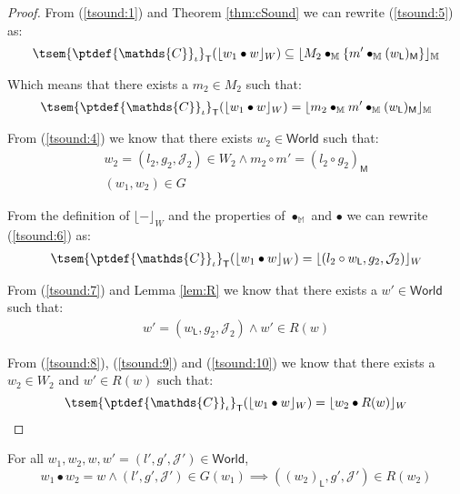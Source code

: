 {\begin{proof}
From (\ref{tsound:1}) and Theorem \ref{thm:cSound} we can rewrite (\ref{tsound:5}) as:
\[
	\tsem{\ptdef{\mathds{C}}_\iota}_\mathsf{T}(\lfloor w_1 \bullet w \rfloor_W)
	\subseteq
	\lfloor M_2 \bullet_\mathbb{M} \{m' \bullet_\mathbb{M} (w_\mathsf{L})_\mathsf{M}\} \rfloor_\mathbb{M}
\]

Which means that there exists a $m_2 \in M_2$ such that:
\begin{gather}\label{tsound:6}
	\tsem{\ptdef{\mathds{C}}_\iota}_\mathsf{T}(\lfloor w_1 \bullet w \rfloor_W)
	=
	\lfloor m_2 \bullet_\mathbb{M} m' \bullet_\mathbb{M} (w_\mathsf{L})_\mathsf{M} \rfloor_\mathbb{M}
\end{gather}

From (\ref{tsound:4}) we know that there exists $w_2 \in \mathsf{World}$ such that:
\begin{gather}
\label{tsound:8} w_2 = (l_2, g_2, \mathcal{J}_2) \in W_2 \land m_2 \circ m' = (l_2 \circ g_2)_\mathsf{M} \\
\label{tsound:7} (w_1, w_2) \in G
\end{gather}

From the definition of $\lfloor - \rfloor_W$ and the properties of $\bullet_\mathbb{M}$ and $\bullet$ we can rewrite (\ref{tsound:6}) as:
\begin{gather}\label{tsound:9}
	\tsem{\ptdef{\mathds{C}}_\iota}_\mathsf{T}(\lfloor w_1 \bullet w \rfloor_W)
	=
	\lfloor (l_2 \circ w_\mathsf{L}, g_2, \mathcal{J}_2) \rfloor_W
\end{gather}

From (\ref{tsound:7}) and Lemma \ref{lem:R} we know that there exists a $w' \in \mathsf{World}$ such that:
\begin{gather}\label{tsound:10}
	w' = (w_\mathsf{L}, g_2, \mathcal{J}_2) \land w' \in R(w)
\end{gather}

From (\ref{tsound:8}), (\ref{tsound:9}) and (\ref{tsound:10}) we know that there exists a $w_2 \in W_2$ and $w' \in R(w)$ such that:
\[
	\tsem{\ptdef{\mathds{C}}_\iota}_\mathsf{T}(\lfloor w_1 \bullet w \rfloor_W) = \lfloor w_2 \bullet R(w) \rfloor_W
\]
\end{proof}
}

\lem \label{lem:R} For all $w_1, w_2, w, w' = (l', g', \mathcal{J}') \in \mathsf{World}$,
\[
	w_1 \bullet w_2 = w \land (l', g', \mathcal{J}') \in G(w_1) \implies ((w_2)_\mathsf{L}, g', \mathcal{J}') \in R(w_2)
\]

